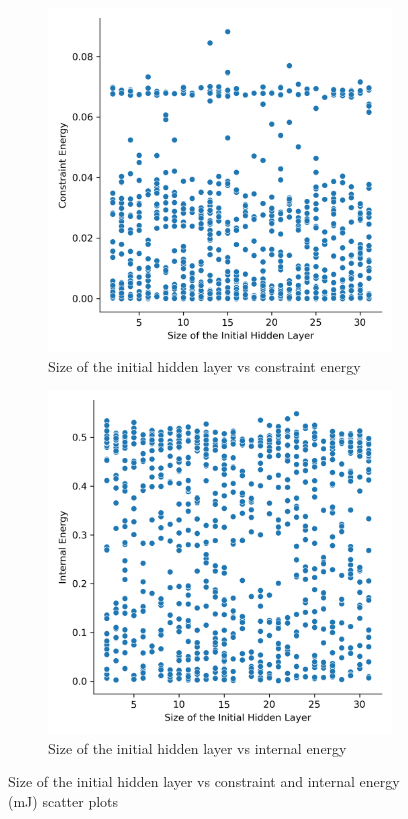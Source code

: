 \begin{figure}[H]
	\centering
	\begin{subfigure}[t]{0.45\textwidth}
		\centering
		\includegraphics[width=\textwidth]{sihl_vs_ce.png}
		\caption{Size of the initial hidden layer vs constraint energy}
	\end{subfigure}
	\hfill
	\begin{subfigure}[t]{0.45\textwidth}
		\centering
		\includegraphics[width=\textwidth]{sihl_vs_ie.png}
		\caption{Size of the initial hidden layer vs internal energy}
	\end{subfigure}
	\caption[Size of the initial hidden layer vs system energies]{Size of the initial hidden layer vs constraint and internal energy (\si{mJ}) scatter plots}
	\label{fig:sihl_v_e}
\end{figure}

